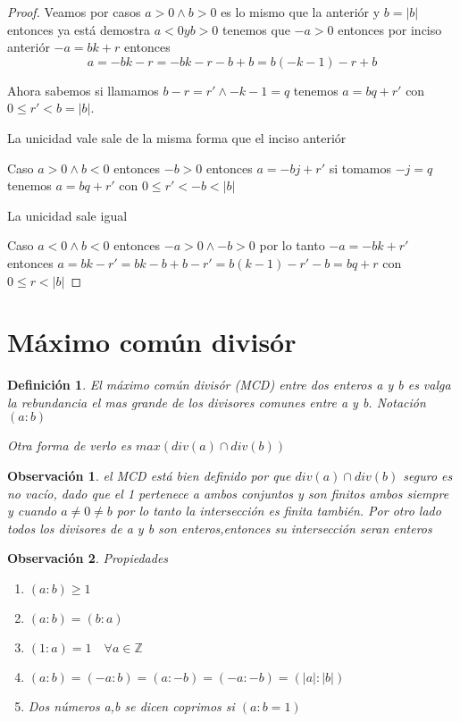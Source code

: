 \documentclass{article}
\theoremstyle{break}
\newtheorem*{remark}{Observación}
\newtheorem{definition}{Definición}[section]
\def \Z{\mathbb{Z}}
\begin{document}
    \begin{proof}
        Veamos por casos $a>0 \land b>0$ es lo mismo que la anteriór y $b = |b|$ entonces ya está demostra
        $a<0 y b>0$ tenemos que $-a>0$ entonces por inciso anteriór $-a = bk + r$ entonces $$a = -bk -r = -bk -r -b +b = b(-k-1) -r+b$$

        Ahora sabemos si llamamos $b-r = r' \land -k-1=q$ tenemos $a = bq +r'$ con  $0 \leq r' < b = |b|$. 

        La unicidad vale sale de la misma forma que el inciso anteriór

        Caso $a>0 \land b<0$ entonces $-b>0$ entonces $a = -bj + r' $ si tomamos $-j = q$ tenemos $a=bq +r'$ con $0\leq r' < -b < |b|$

        La unicidad sale igual

        Caso $a<0 \land b<0$ entonces $-a>0 \land -b>0$ por lo tanto $-a = -bk +r'$ entonces 
        $a = bk -r' = bk -b +b -r' = b(k-1) -r' - b = bq + r$ con $0 \leq r< |b|$
    \end{proof}
    
    \section{Máximo común divisór}    

    \begin{definition}
        El máximo común divisór (MCD) entre dos enteros a y b es valga la rebundancia el mas grande de 
        los divisores comunes entre a y b. Notación $(a:b)$

        Otra forma de verlo es $max(div(a) \cap div(b))$
    \end{definition}

    \begin{remark}
        el MCD está bien definido por que $div(a) \cap div(b)$ seguro es no vacío, dado que el 1 pertenece
        a ambos conjuntos y son finitos ambos siempre y cuando $a \neq 0 \neq b$ por lo tanto la intersección
        es finita también. Por otro lado todos los divisores de a y b son enteros,entonces su intersección
        seran enteros
    \end{remark}

    \begin{remark}
        Propiedades
        \begin{enumerate}
            \item $(a:b) \geq 1$
            \item $(a:b) = (b:a)$
            \item $(1:a) = 1\quad \forall a \in \Z$
            \item $(a:b) = (-a:b) = (a:-b)=(-a:-b) = (|a|:|b|)$
            \item Dos números a,b se dicen coprimos si $(a:b = 1)$
        \end{enumerate}
    \end{remark}
\end{document}
